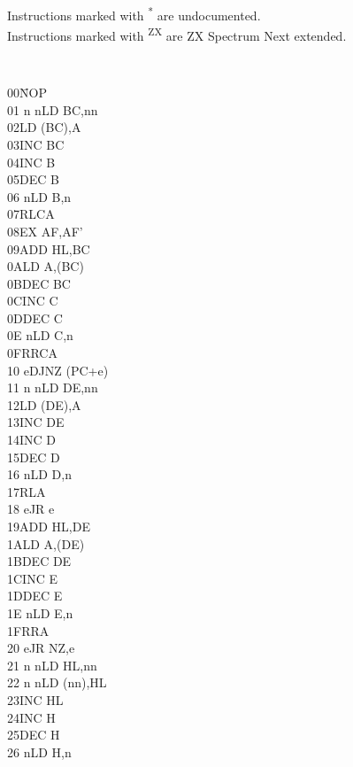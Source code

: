 \documentclass[oneside,a4paper]{book}
\begin{document}
Instructions marked with \textsuperscript{*} are undocumented.\\
Instructions marked with \textsuperscript{ZX} are ZX Spectrum Next extended.
\begin{multicols}{3}

\scriptsize
{\tt
\begin{tabbing}
00{\qquad}{\qquad}{\quad}\=NOP\\
01 n n\>LD BC,nn\\
02\>LD (BC),A\\
03\>INC BC\\
04\>INC B\\
05\>DEC B\\
06 n\>LD B,n\\
07\>RLCA\\
08\>EX AF,AF'\\
09\>ADD HL,BC\\
0A\>LD A,(BC)\\
0B\>DEC BC\\
0C\>INC C\\
0D\>DEC C\\
0E n\>LD C,n\\
0F\>RRCA\\
10 e\>DJNZ (PC+e)\\
11 n n\>LD DE,nn\\
12\>LD (DE),A\\
13\>INC DE\\
14\>INC D\\
15\>DEC D\\
16 n\>LD D,n\\
17\>RLA\\
18 e\>JR e\\
19\>ADD HL,DE\\
1A\>LD A,(DE)\\
1B\>DEC DE\\
1C\>INC E\\
1D\>DEC E\\
1E n\>LD E,n\\
1F\>RRA\\
20 e\>JR NZ,e\\
21 n n\>LD HL,nn\\
22 n n\>LD (nn),HL\\
23\>INC HL\\
24\>INC H\\
25\>DEC H\\
26 n\>LD H,n\\

\end{tabbing}}
\end{multicols}
\end{document}
